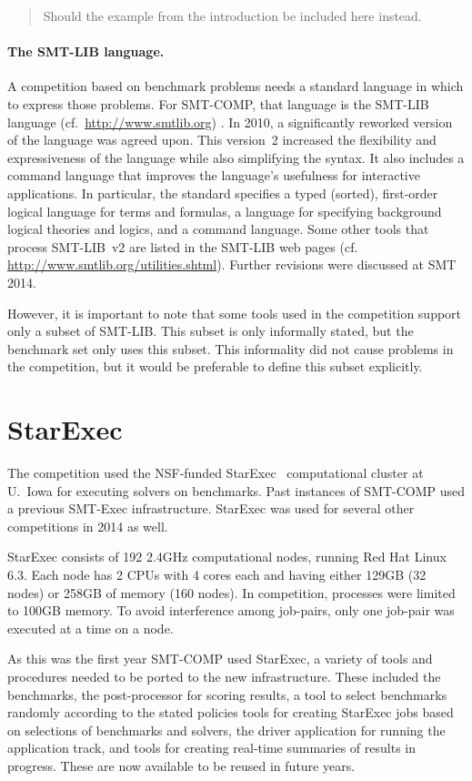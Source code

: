 \documentclass[twoside,11pt]{article}
\newcommand{\comment}[2]{\begin{quote}\sc #1\marginpar{\textcolor{red}{$\ast^{\mbox{#2}}$}}\end{quote}}
\newcommand{\davidc}[1]{\comment{#1}{DC}}
\begin{document}
\davidc{Should the example from the introduction be included here instead.}

\paragraph{The SMT-LIB language.} A competition based on benchmark problems needs a standard language in which to express those problems.
For SMT-COMP, that language is the SMT-LIB language (cf.~\url{http://www.smtlib.org}) \cite{BarST-SMT-10,Cok-SMTLIBTutorial-2011}.
In 2010, a significantly reworked version of the language was agreed upon.
This version~2 increased the flexibility and expressiveness of the language while also simplifying the syntax. 
It also includes a command language that improves the language's usefulness for interactive applications.
In particular, the standard specifies a typed (sorted), first-order logical language for terms and formulas, a language for specifying background logical theories and logics, and a command language. Some other tools that process SMT-LIB~v2 are listed in the SMT-LIB web pages (cf. \url{http://www.smtlib.org/utilities.shtml}). Further revisions were discussed at SMT 2014.

However, it is important to note that some tools used in the competition support only a subset of SMT-LIB. This subset is only informally stated, but the benchmark set only uses this subset. This informality did not cause problems in the competition, but it would be preferable to define this subset explicitly.

\section{StarExec}
\label{sec:starexec}

The competition used the NSF-funded StarExec~\cite{DBLP:conf/cade/StumpST14} computational cluster at U.~Iowa for executing solvers on benchmarks. Past instances of SMT-COMP used a previous SMT-Exec infrastructure. StarExec was used for several other competitions in 2014 as well.

StarExec consists of 192 2.4GHz computational nodes, running Red Hat Linux 6.3. Each node has 2 CPUs with 4 cores each and having either 129GB (32 nodes) or 258GB of memory (160 nodes). In competition, processes were limited to 100GB memory. To avoid interference among job-pairs, only one job-pair was executed at a time on a node. 

As this was the first year SMT-COMP used StarExec, a variety of tools and procedures needed to be ported to the new infrastructure. 
These included the benchmarks, the post-processor for scoring results, 
a tool to select benchmarks randomly according to the stated policies
tools for creating StarExec jobs based on selections of benchmarks and solvers, 
the driver application for running the application track, 
and tools for creating real-time summaries of results in progress. 
These are now available to be reused in future years.
\end{document}
